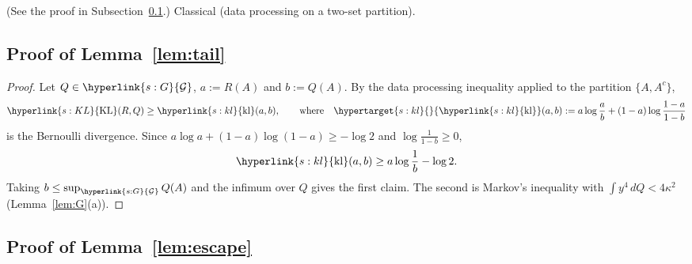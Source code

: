 \documentclass[11pt]{article}
\newcommand{\dt}[1]{\hypertarget{#1}{}}
\newcommand{\sy}[2]{{\hyperlink{#1}{#2}}}
\newcommand{\KL}{\sy{s:KL}{\mathrm{KL}}}
\newcommand{\kl}{\sy{s:kl}{\mathrm{kl}}}
\newcommand{\Gk}{\sy{s:G}{\mathcal{G}}}
\begin{document}
(See the proof in Subsection~\ref{sec:proof-lem-tail}.) Classical (data processing on a two-set partition).

\subsection{Proof of Lemma~\ref{lem:tail}}\label{sec:proof-lem-tail}

\begin{proof}
Let $Q\in\Gk$, $a:=R(A)$ and $b:=Q(A)$. By the data processing inequality applied to the partition $\{A,A^c\}$,
\begin{equation*}
  \KL(R,Q)\ge\kl(a,b),\qquad\text{where}\quad\dt{s:kl}\kl(a,b):=a\log\frac ab+(1-a)\log\frac{1-a}{1-b}
\end{equation*}
is the Bernoulli divergence. Since $a\log a+(1-a)\log(1-a)\ge-\log2$ and $\log\frac1{1-b}\ge0$,
\begin{equation*}
  \kl(a,b)\ge a\log\frac1b-\log2 .
\end{equation*} Taking $b\le\sup_{\Gk}Q(A)$ and the infimum over $Q$
gives the first claim. The second is Markov's inequality with $\int y^4\,dQ<4\kappa^2$ (Lemma~\ref{lem:G}(a)).
\end{proof}

\subsection{Proof of Lemma~\ref{lem:escape}}\label{sec:proof-lem-escape}
\end{document}
